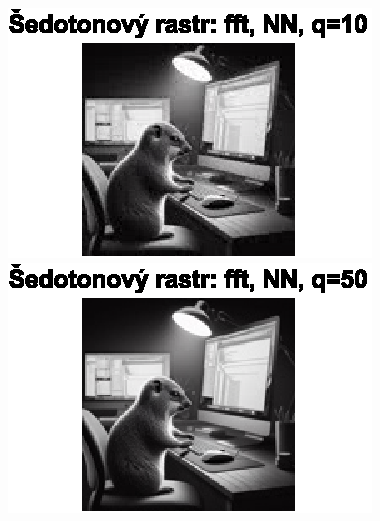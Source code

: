 \begin{figure}[H]
\begin{minipage}[b]{0.3\textwidth}
    \end{minipage}
\end{figure}

\begin{figure}[H]
    \centering
    \begin{minipage}[b]{0.3\textwidth}
        \centering
        \includegraphics[width=\textwidth]{images/sedo_fft_NN_q10.eps}
    \end{minipage}
    \hfill
    \begin{minipage}[b]{0.3\textwidth}
        \centering
        \includegraphics[width=\textwidth]{images/sedo_fft_NN_q50.eps}
    \end{minipage}
    \hfill
    \begin{minipage}[b]{0.3\textwidth}
        \centering

\end{minipage}
\end{figure}
